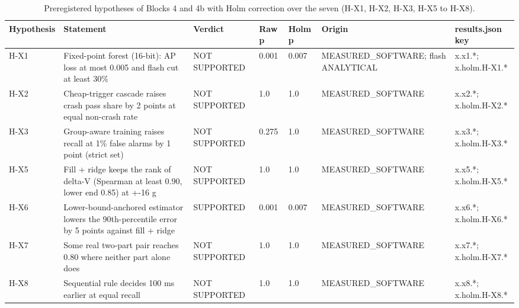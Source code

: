 \begin{table}[t]
\centering
\small
\caption{Preregistered hypotheses of Blocks 4 and 4b with Holm correction over the seven (H-X1, H-X2, H-X3, H-X5 to H-X8).}
\label{tab:jp_tab_x_verdicts}
\begin{tabular}{lllllll}
\toprule
Hypothesis & Statement & Verdict & Raw p & Holm p & Origin & results.json key \\
\midrule
H-X1 & Fixed-point forest (16-bit): AP loss at most 0.005 and flash cut at least 30\% & NOT SUPPORTED & 0.001 & 0.007 & MEASURED\_SOFTWARE; flash ANALYTICAL & x.x1.*; x.holm.H-X1.* \\
H-X2 & Cheap-trigger cascade raises crash pass share by 2 points at equal non-crash rate & NOT SUPPORTED & 1.0 & 1.0 & MEASURED\_SOFTWARE & x.x2.*; x.holm.H-X2.* \\
H-X3 & Group-aware training raises recall at 1\% false alarms by 1 point (strict set) & NOT SUPPORTED & 0.275 & 1.0 & MEASURED\_SOFTWARE & x.x3.*; x.holm.H-X3.* \\
H-X5 & Fill + ridge keeps the rank of delta-V (Spearman at least 0.90, lower end 0.85) at +-16 g & NOT SUPPORTED & 1.0 & 1.0 & MEASURED\_SOFTWARE & x.x5.*; x.holm.H-X5.* \\
H-X6 & Lower-bound-anchored estimator lowers the 90th-percentile error by 5 points against fill + ridge & SUPPORTED & 0.001 & 0.007 & MEASURED\_SOFTWARE & x.x6.*; x.holm.H-X6.* \\
H-X7 & Some real two-part pair reaches 0.80 where neither part alone does & NOT SUPPORTED & 1.0 & 1.0 & MEASURED\_SOFTWARE & x.x7.*; x.holm.H-X7.* \\
H-X8 & Sequential rule decides 100 ms earlier at equal recall & NOT SUPPORTED & 1.0 & 1.0 & MEASURED\_SOFTWARE & x.x8.*; x.holm.H-X8.* \\
\bottomrule
\end{tabular}
\end{table}
